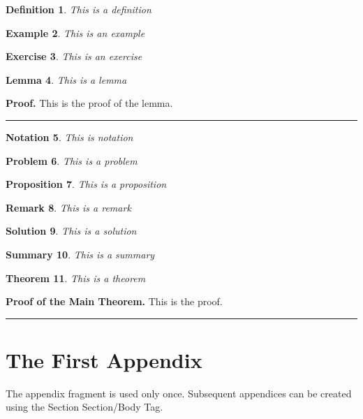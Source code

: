 \documentclass{article}
\newtheorem{theorem}{Theorem}
\newtheorem{definition}[theorem]{Definition}
\newtheorem{example}[theorem]{Example}
\newtheorem{exercise}[theorem]{Exercise}
\newtheorem{lemma}[theorem]{Lemma}
\newtheorem{notation}[theorem]{Notation}
\newtheorem{problem}[theorem]{Problem}
\newtheorem{proposition}[theorem]{Proposition}
\newtheorem{remark}[theorem]{Remark}
\newtheorem{solution}[theorem]{Solution}
\newtheorem{summary}[theorem]{Summary}
\newenvironment{proof}[1][Proof]{\noindent\textbf{#1.} }{\ \rule{0.5em}{0.5em}}
\begin{document}
\begin{definition}
This is a definition
\end{definition}

\begin{example}
This is an example
\end{example}

\begin{exercise}
This is an exercise
\end{exercise}

\begin{lemma}
This is a lemma
\end{lemma}

\begin{proof}
This is the proof of the lemma.
\end{proof}

\begin{notation}
This is notation
\end{notation}

\begin{problem}
This is a problem
\end{problem}

\begin{proposition}
This is a proposition
\end{proposition}

\begin{remark}
This is a remark
\end{remark}

\begin{solution}
This is a solution
\end{solution}

\begin{summary}
This is a summary
\end{summary}

\begin{theorem}
This is a theorem
\end{theorem}

\begin{proof}[Proof of the Main Theorem]
This is the proof.
\end{proof}

\appendix

\section{The First Appendix}

The appendix fragment is used only once. Subsequent appendices can be
created using the Section Section/Body Tag.
\end{document}
